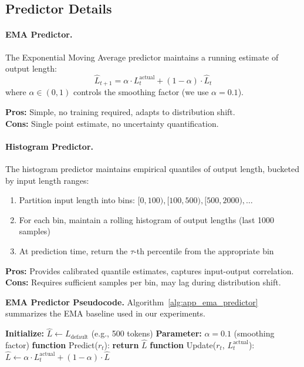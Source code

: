 \subsection{Predictor Details}
\label{app:predictors}

\paragraph{EMA Predictor.}
The Exponential Moving Average predictor maintains a running estimate of output length:
\[
\hat{L}_{t+1} = \alpha \cdot L_t^{\text{actual}} + (1 - \alpha) \cdot \hat{L}_t
\]
where $\alpha \in (0, 1)$ controls the smoothing factor (we use $\alpha = 0.1$).

\textbf{Pros:} Simple, no training required, adapts to distribution shift.\\
\textbf{Cons:} Single point estimate, no uncertainty quantification.

\paragraph{Histogram Predictor.}
The histogram predictor maintains empirical quantiles of output length, bucketed by input length ranges:
\begin{enumerate}
    \item Partition input length into bins: $[0, 100), [100, 500), [500, 2000), \ldots$
    \item For each bin, maintain a rolling histogram of output lengths (last 1000 samples)
    \item At prediction time, return the $\tau$-th percentile from the appropriate bin
\end{enumerate}

\textbf{Pros:} Provides calibrated quantile estimates, captures input-output correlation.\\
\textbf{Cons:} Requires sufficient samples per bin, may lag during distribution shift.

\noindent\textbf{EMA Predictor Pseudocode.} Algorithm~\ref{alg:app_ema_predictor} summarizes the EMA baseline used in our experiments.

\begin{algorithm}[H]
\caption{Exponential Moving Average (EMA) Predictor}
\label{alg:app_ema_predictor}
\begin{algorithmic}
\STATE \textbf{Initialize:} $\hat{L} \gets L_{\text{default}}$ (e.g., 500 tokens)
\STATE \textbf{Parameter:} $\alpha = 0.1$ (smoothing factor)
\STATE \textbf{function} Predict($r_t$):
\STATE \quad \textbf{return} $\hat{L}$
\STATE \textbf{function} Update($r_t$, $L_t^{\text{actual}}$):
\STATE \quad $\hat{L} \gets \alpha \cdot L_t^{\text{actual}} + (1 - \alpha) \cdot \hat{L}$
\end{algorithmic}
\end{algorithm}

